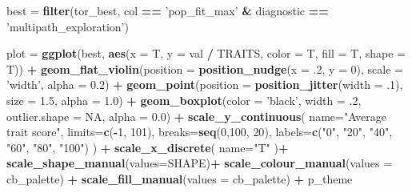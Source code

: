 \documentclass[]{book}
\newenvironment{Shaded}{\begin{snugshade}}{\end{snugshade}}
\newcommand{\DataTypeTok}[1]{\textcolor[rgb]{0.13,0.29,0.53}{#1}}
\newcommand{\DecValTok}[1]{\textcolor[rgb]{0.00,0.00,0.81}{#1}}
\newcommand{\FloatTok}[1]{\textcolor[rgb]{0.00,0.00,0.81}{#1}}
\newcommand{\KeywordTok}[1]{\textcolor[rgb]{0.13,0.29,0.53}{\textbf{#1}}}
\newcommand{\NormalTok}[1]{#1}
\newcommand{\OperatorTok}[1]{\textcolor[rgb]{0.81,0.36,0.00}{\textbf{#1}}}
\newcommand{\OtherTok}[1]{\textcolor[rgb]{0.56,0.35,0.01}{#1}}
\newcommand{\StringTok}[1]{\textcolor[rgb]{0.31,0.60,0.02}{#1}}
\begin{document}
\begin{Shaded}
\begin{Highlighting}[]
\NormalTok{best =}\StringTok{ }\KeywordTok{filter}\NormalTok{(tor_best, col }\OperatorTok{==}\StringTok{ 'pop_fit_max'} \OperatorTok{&}\StringTok{ }\NormalTok{diagnostic }\OperatorTok{==}\StringTok{ 'multipath_exploration'}\NormalTok{)}

\NormalTok{plot =}\StringTok{ }\KeywordTok{ggplot}\NormalTok{(best, }\KeywordTok{aes}\NormalTok{(}\DataTypeTok{x =}\NormalTok{ T, }\DataTypeTok{y =}\NormalTok{ val }\OperatorTok{/}\StringTok{ }\NormalTok{TRAITS, }\DataTypeTok{color =}\NormalTok{ T, }\DataTypeTok{fill =}\NormalTok{ T, }\DataTypeTok{shape =}\NormalTok{ T)) }\OperatorTok{+}
\StringTok{  }\KeywordTok{geom_flat_violin}\NormalTok{(}\DataTypeTok{position =} \KeywordTok{position_nudge}\NormalTok{(}\DataTypeTok{x =} \FloatTok{.2}\NormalTok{, }\DataTypeTok{y =} \DecValTok{0}\NormalTok{), }\DataTypeTok{scale =} \StringTok{'width'}\NormalTok{, }\DataTypeTok{alpha =} \FloatTok{0.2}\NormalTok{) }\OperatorTok{+}
\StringTok{  }\KeywordTok{geom_point}\NormalTok{(}\DataTypeTok{position =} \KeywordTok{position_jitter}\NormalTok{(}\DataTypeTok{width =} \FloatTok{.1}\NormalTok{), }\DataTypeTok{size =} \FloatTok{1.5}\NormalTok{, }\DataTypeTok{alpha =} \FloatTok{1.0}\NormalTok{) }\OperatorTok{+}
\StringTok{  }\KeywordTok{geom_boxplot}\NormalTok{(}\DataTypeTok{color =} \StringTok{'black'}\NormalTok{, }\DataTypeTok{width =} \FloatTok{.2}\NormalTok{, }\DataTypeTok{outlier.shape =} \OtherTok{NA}\NormalTok{, }\DataTypeTok{alpha =} \FloatTok{0.0}\NormalTok{) }\OperatorTok{+}
\StringTok{  }\KeywordTok{scale_y_continuous}\NormalTok{(}
    \DataTypeTok{name=}\StringTok{"Average trait score"}\NormalTok{,}
    \DataTypeTok{limits=}\KeywordTok{c}\NormalTok{(}\OperatorTok{-}\DecValTok{1}\NormalTok{, }\DecValTok{101}\NormalTok{),}
    \DataTypeTok{breaks=}\KeywordTok{seq}\NormalTok{(}\DecValTok{0}\NormalTok{,}\DecValTok{100}\NormalTok{, }\DecValTok{20}\NormalTok{),}
    \DataTypeTok{labels=}\KeywordTok{c}\NormalTok{(}\StringTok{"0"}\NormalTok{, }\StringTok{"20"}\NormalTok{, }\StringTok{"40"}\NormalTok{, }\StringTok{"60"}\NormalTok{, }\StringTok{"80"}\NormalTok{, }\StringTok{"100"}\NormalTok{)}
\NormalTok{  ) }\OperatorTok{+}
\StringTok{  }\KeywordTok{scale_x_discrete}\NormalTok{(}
    \DataTypeTok{name=}\StringTok{"T"}
\NormalTok{  )}\OperatorTok{+}
\StringTok{  }\KeywordTok{scale_shape_manual}\NormalTok{(}\DataTypeTok{values=}\NormalTok{SHAPE)}\OperatorTok{+}
\StringTok{  }\KeywordTok{scale_colour_manual}\NormalTok{(}\DataTypeTok{values =}\NormalTok{ cb_palette) }\OperatorTok{+}
\StringTok{  }\KeywordTok{scale_fill_manual}\NormalTok{(}\DataTypeTok{values =}\NormalTok{ cb_palette) }\OperatorTok{+}
\StringTok{  }\NormalTok{p_theme}


\end{Highlighting}
\end{Shaded}
\end{document}
